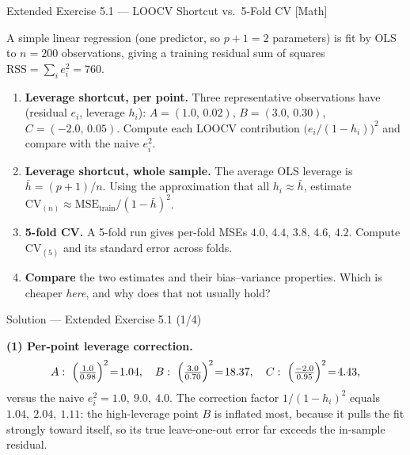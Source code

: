 \documentclass[aspectratio=169,11pt]{beamer}
\begin{document}
\begin{frame}{Extended Exercise 5.1 --- LOOCV Shortcut vs.\ 5-Fold CV [Math]}\label{frm:ee51}
  \begin{longexercise}
    A simple linear regression (one predictor, so $p+1=2$ parameters) is
    fit by OLS to $n = 200$ observations, giving a training residual sum
    of squares $\mathrm{RSS} = \sum_i e_i^2 = 760$.
    \begin{enumerate}
      \item \textbf{Leverage shortcut, per point.} Three representative
            observations have (residual $e_i$, leverage $h_i$):
            $A=(1.0,\,0.02)$, $B=(3.0,\,0.30)$, $C=(-2.0,\,0.05)$.
            Compute each LOOCV contribution $\bigl(e_i/(1-h_i)\bigr)^2$
            and compare with the naive $e_i^2$.
      \item \textbf{Leverage shortcut, whole sample.} The average OLS
            leverage is $\bar h=(p+1)/n$. Using the approximation that
            all $h_i\approx\bar h$, estimate
            $\mathrm{CV}_{(n)}\approx \mathrm{MSE}_{\text{train}}/(1-\bar h)^2$.
      \item \textbf{5-fold CV.} A 5-fold run gives per-fold MSEs
            $4.0,\,4.4,\,3.8,\,4.6,\,4.2$. Compute $\mathrm{CV}_{(5)}$ and
            its standard error across folds.
      \item \textbf{Compare} the two estimates and their bias--variance
            properties. Which is cheaper \emph{here}, and why does that
            not usually hold?
    \end{enumerate}
  \end{longexercise}
\end{frame}

\begin{frame}{Solution --- Extended Exercise 5.1 (1/4)}
  \begin{solutionbox}
    \textbf{(1) Per-point leverage correction.}
    \[
      A:\ \Bigl(\tfrac{1.0}{0.98}\Bigr)^2\!=\!1.04,\quad
      B:\ \Bigl(\tfrac{3.0}{0.70}\Bigr)^2\!=\!18.37,\quad
      C:\ \Bigl(\tfrac{-2.0}{0.95}\Bigr)^2\!=\!4.43,
    \]
    versus the naive $e_i^2 = 1.0,\ 9.0,\ 4.0$. The correction factor
    $1/(1-h_i)^2$ equals $1.04,\ 2.04,\ 1.11$: the high-leverage point
    $B$ is inflated most, because it pulls the fit strongly toward
    itself, so its true leave-one-out error far exceeds the in-sample
    residual.
  \end{solutionbox}
\end{frame}
\end{document}

